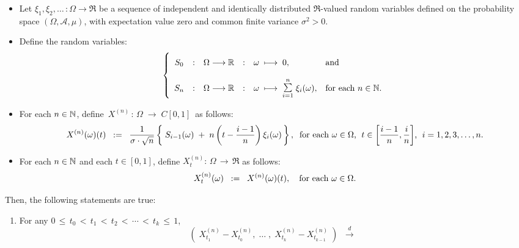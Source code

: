 \begin{theorem}
\mbox{}\vskip 0cm
\begin{itemize}
\item	Let $\xi_{1}, \xi_{2}, \ldots\, : \Omega \longrightarrow \Re$ be a sequence of
		independent and identically distributed $\Re$-valued random variables
		defined on the probability space $(\Omega,\mathcal{A},\mu)$,
		with expectation value zero and common finite variance $\sigma^{2} > 0$.
\item	Define the random variables:
		\begin{equation*}
		\left\{\begin{array}{ccccll}
		S_{0}
		&:&\overset{{\color{white}1}}{\Omega} \longrightarrow \Re
		&:& \omega \;\longmapsto\; 0,
		& \textnormal{and}
		\\ \\
		S_{n}
		&:&	\Omega \longrightarrow \Re
		&:&	\omega \;\longmapsto\; \overset{n}{\underset{i=1}{\textnormal{\Large$\sum$}}}\;\xi_{i}(\omega),
		& \textnormal{for each $n \in \N$}.
		\end{array}\right.
		\end{equation*}
\item	For each $n \in \mathbb{N}$, define \,$X^{(n)} \,:\, \Omega \;\longrightarrow\;C[0,1]$\, as follows:
		\begin{equation*}
		X^{(n)}(\omega)(t)
		\;\; := \;\;
		\dfrac{1}{\sigma\cdot\sqrt{n}}
		\left\{\;
		S_{i-1}(\omega) \;+\; n\left(t - \dfrac{i-1}{n}\right)\xi_{i}(\omega)
		\,\right\},
		\;\;
		\textnormal{for each $\omega \in \Omega$, \;$t \in \left[\frac{i-1}{n},\frac{i}{n}\right]$, \;$i = 1,2,3,\ldots,n$}.
		\end{equation*}
\item	For each $n \in \mathbb{N}$ and each $t \in [0,1]$, define
		\;$X^{(n)}_{t} : \,\Omega \, \longrightarrow \, \Re$\;
		as follows:
		\begin{equation*}
		X^{(n)}_{t}(\omega) \;\; := \;\; X^{(n)}(\omega)(t),
		\quad
		\textnormal{for each $\omega \in \Omega$}.
		\end{equation*}
\end{itemize}
Then, the following statements are true:
\begin{enumerate}
\item	For any \;$0 \,\leq\, t_{0} \,<\, t_{1} \,<\, t_{2} \,<\, \cdots \,<\, t_{k} \,\leq\, 1$,
		\begin{equation*}
		\left(\;X^{(n)}_{t_{1}} - X^{(n)}_{t_{0}}, \;\ldots\;,\; X^{(n)}_{t_{k}} - X^{(n)}_{t_{k-1}}\;\right)
		\;\; \overset{d}{\longrightarrow} \;\;

\end{equation*}
\end{enumerate}
\end{theorem}
